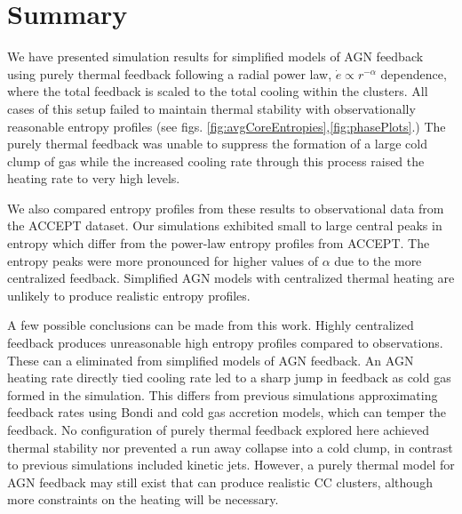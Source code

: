 \documentclass[iop,apjl, twocolappendix]{emulateapj}   %
\begin{document}
\section{Summary}
\label{sec:summary}

We have presented simulation results for simplified models of AGN feedback
using purely thermal feedback following a radial power law, $\dot e \propto
r^{-\alpha}$ dependence, where the total feedback is scaled to the total
cooling within the clusters. All cases of this setup failed to maintain thermal
stability with observationally reasonable entropy profiles (see figs.
\ref{fig:avgCoreEntropies},\ref{fig:phasePlots}.) The purely thermal feedback was unable
to suppress the formation of a large cold clump of gas while the increased
cooling rate through this process raised the heating rate to very high levels.

We also compared entropy profiles from these results to observational data from
the ACCEPT dataset. Our simulations exhibited small to large central peaks in
entropy which differ from the power-law entropy profiles from ACCEPT. The
entropy peaks were more pronounced for higher values of $\alpha$ due to the
more centralized feedback. Simplified AGN models with centralized thermal
heating are unlikely to produce realistic entropy profiles.

A few possible conclusions can be made from this work. Highly centralized
feedback produces unreasonable high entropy profiles compared to observations.
These can a eliminated from simplified models of AGN feedback.  An AGN heating
rate directly tied cooling rate led to a sharp jump in feedback as cold gas
formed in the simulation. This differs from previous simulations approximating
feedback rates using Bondi and cold gas accretion models, which can temper the
feedback.  No configuration of purely thermal feedback explored here achieved
thermal stability nor prevented a run away collapse into a cold clump, in
contrast to previous simulations included kinetic jets. However, a purely
thermal model for AGN feedback may still exist that can produce realistic CC
clusters, although more constraints on the heating will be necessary.

\end{document}
